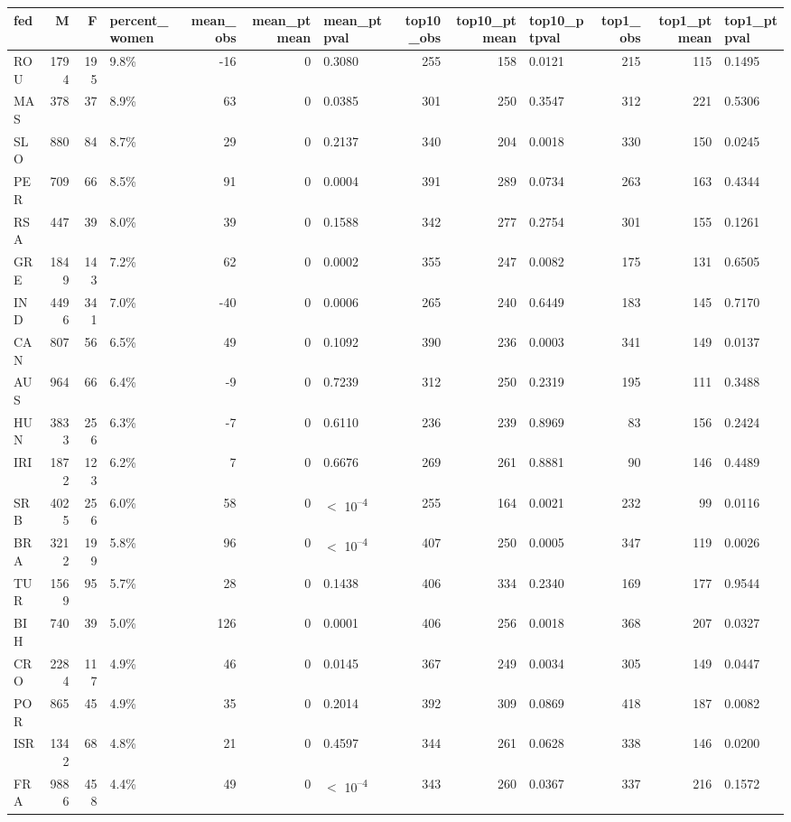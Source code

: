 
\begin{tabular}[t]{lrrlrrlrrlrrl}
\toprule
fed & M & F & percent_women & mean_obs & mean_ptmean & mean_ptpval & top10_obs & top10_ptmean & top10_ptpval & top1_obs & top1_ptmean & top1_ptpval\\
\midrule
ROU & 1794 & 195 & 9.8\% & -16 & 0 & 0.3080 & 255 & 158 & 0.0121 & 215 & 115 & 0.1495\\
MAS & 378 & 37 & 8.9\% & 63 & 0 & 0.0385 & 301 & 250 & 0.3547 & 312 & 221 & 0.5306\\
SLO & 880 & 84 & 8.7\% & 29 & 0 & 0.2137 & 340 & 204 & 0.0018 & 330 & 150 & 0.0245\\
PER & 709 & 66 & 8.5\% & 91 & 0 & 0.0004 & 391 & 289 & 0.0734 & 263 & 163 & 0.4344\\
RSA & 447 & 39 & 8.0\% & 39 & 0 & 0.1588 & 342 & 277 & 0.2754 & 301 & 155 & 0.1261\\
GRE & 1849 & 143 & 7.2\% & 62 & 0 & 0.0002 & 355 & 247 & 0.0082 & 175 & 131 & 0.6505\\
IND & 4496 & 341 & 7.0\% & -40 & 0 & 0.0006 & 265 & 240 & 0.6449 & 183 & 145 & 0.7170\\
CAN & 807 & 56 & 6.5\% & 49 & 0 & 0.1092 & 390 & 236 & 0.0003 & 341 & 149 & 0.0137\\
AUS & 964 & 66 & 6.4\% & -9 & 0 & 0.7239 & 312 & 250 & 0.2319 & 195 & 111 & 0.3488\\
HUN & 3833 & 256 & 6.3\% & -7 & 0 & 0.6110 & 236 & 239 & 0.8969 & 83 & 156 & 0.2424\\
IRI & 1872 & 123 & 6.2\% & 7 & 0 & 0.6676 & 269 & 261 & 0.8881 & 90 & 146 & 0.4489\\
SRB & 4025 & 256 & 6.0\% & 58 & 0 & $<$ 10\textsuperscript{--4} & 255 & 164 & 0.0021 & 232 & 99 & 0.0116\\
BRA & 3212 & 199 & 5.8\% & 96 & 0 & $<$ 10\textsuperscript{--4} & 407 & 250 & 0.0005 & 347 & 119 & 0.0026\\
TUR & 1569 & 95 & 5.7\% & 28 & 0 & 0.1438 & 406 & 334 & 0.2340 & 169 & 177 & 0.9544\\
BIH & 740 & 39 & 5.0\% & 126 & 0 & 0.0001 & 406 & 256 & 0.0018 & 368 & 207 & 0.0327\\
CRO & 2284 & 117 & 4.9\% & 46 & 0 & 0.0145 & 367 & 249 & 0.0034 & 305 & 149 & 0.0447\\
POR & 865 & 45 & 4.9\% & 35 & 0 & 0.2014 & 392 & 309 & 0.0869 & 418 & 187 & 0.0082\\
ISR & 1342 & 68 & 4.8\% & 21 & 0 & 0.4597 & 344 & 261 & 0.0628 & 338 & 146 & 0.0200\\
FRA & 9886 & 458 & 4.4\% & 49 & 0 & $<$ 10\textsuperscript{--4} & 343 & 260 & 0.0367 & 337 & 216 & 0.1572\\

\end{tabular}
